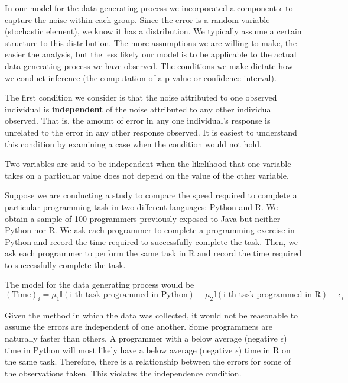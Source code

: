 \documentclass[]{book}
\theoremstyle{definition}
\theoremstyle{definition}
\theoremstyle{remark}
\let\BeginKnitrBlock\begin \let\EndKnitrBlock\end
\begin{document}
In our model for the data-generating process we incorporated a component
\(\epsilon\) to capture the noise within each group. Since the error is
a random variable (stochastic element), we know it has a distribution.
We typically assume a certain structure to this distribution. The more
assumptions we are willing to make, the easier the analysis, but the
less likely our model is to be applicable to the actual data-generating
process we have observed. The conditions we make dictate how we conduct
inference (the computation of a p-value or confidence interval).

The first condition we consider is that the noise attributed to one
observed individual is \textbf{independent} of the noise attributed to
any other individual observed. That is, the amount of error in any one
individual's response is unrelated to the error in any other response
observed. It is easiest to understand this condition by examining a case
when the condition would not hold.

\BeginKnitrBlock{definition}[Independence]
\protect\hypertarget{def:defn-independence}{}{\label{def:defn-independence}
{} }Two variables are said to be independent
when the likelihood that one variable takes on a particular value does
not depend on the value of the other variable.
\EndKnitrBlock{definition}

\BeginKnitrBlock{example}[Programming Speed]
\protect\hypertarget{ex:ex-programming}{}{\label{ex:ex-programming}
{} }Suppose we are conducting a study to
compare the speed required to complete a particular programming task in
two different languages: Python and R. We obtain a sample of 100
programmers previously exposed to Java but neither Python nor R. We ask
each programmer to complete a programming exercise in Python and record
the time required to successfully complete the task. Then, we ask each
programmer to perform the same task in R and record the time required to
successfully complete the task.

The model for the data generating process would be \[
(\text{Time})_i = \mu_1 \mathbb{I}(\text{i-th task programmed in Python}) + \mu_2 \mathbb{I}(\text{i-th task programmed in R}) + \epsilon_i
\]

Given the method in which the data was collected, it would not be
reasonable to assume the errors are independent of one another. Some
programmers are naturally faster than others. A programmer with a below
average (negative \(\epsilon\)) time in Python will most likely have a
below average (negative \(\epsilon\)) time in R on the same task.
Therefore, there is a relationship between the errors for some of the
observations taken. This violates the independence condition.
\EndKnitrBlock{example}
\end{document}
